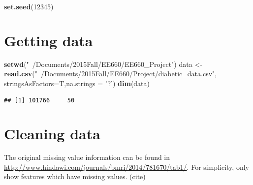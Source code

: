 \documentclass[]{article}
\newenvironment{Shaded}{\begin{snugshade}}{\end{snugshade}}
\newcommand{\KeywordTok}[1]{\textcolor[rgb]{0.13,0.29,0.53}{\textbf{{#1}}}}
\newcommand{\DataTypeTok}[1]{\textcolor[rgb]{0.13,0.29,0.53}{{#1}}}
\newcommand{\DecValTok}[1]{\textcolor[rgb]{0.00,0.00,0.81}{{#1}}}
\newcommand{\StringTok}[1]{\textcolor[rgb]{0.31,0.60,0.02}{{#1}}}
\newcommand{\NormalTok}[1]{{#1}}
\begin{document}
\begin{Shaded}
\begin{Highlighting}[]
\KeywordTok{set.seed}\NormalTok{(}\DecValTok{12345}\NormalTok{)}
\end{Highlighting}
\end{Shaded}

\section{Getting data}\label{getting-data}

\begin{Shaded}
\begin{Highlighting}[]
\KeywordTok{setwd}\NormalTok{(}\StringTok{"~/Documents/2015Fall/EE660/EE660_Project"}\NormalTok{)}
\NormalTok{data <-}\StringTok{ }\KeywordTok{read.csv}\NormalTok{(}\StringTok{"~/Documents/2015Fall/EE660/Project/diabetic_data.csv"}\NormalTok{,}
                 \DataTypeTok{stringsAsFactors=}\NormalTok{T,}\DataTypeTok{na.strings =} \StringTok{'?'}\NormalTok{)}
\KeywordTok{dim}\NormalTok{(data)}
\end{Highlighting}
\end{Shaded}

\begin{verbatim}
## [1] 101766     50
\end{verbatim}

\section{Cleaning data}\label{cleaning-data}

The original missing value information can be found in
\url{http://www.hindawi.com/journals/bmri/2014/781670/tab1/}. For
simplicity, only show features which have missing values. (cite)
\end{document}

